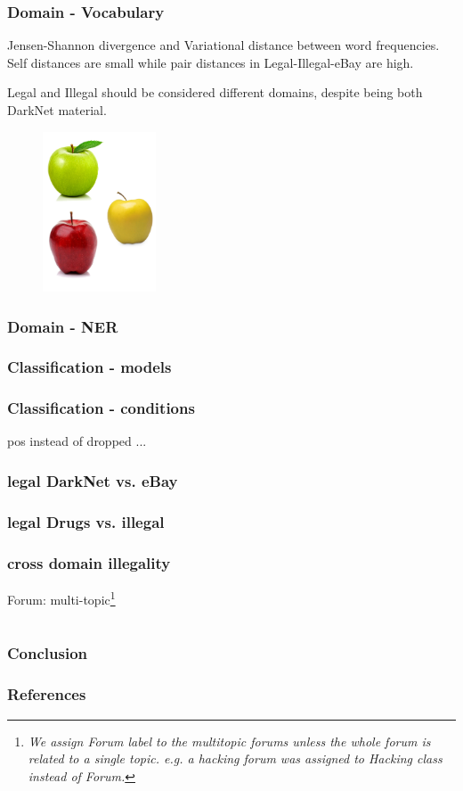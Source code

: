 \documentclass[t,xcolor={svgnames,table}]{beamer}
\begin{document}
\begin{frame}
	\frametitle{Domain - Vocabulary}
	Jensen-Shannon divergence and Variational distance between word frequencies.
	Self distances are small while pair distances in Legal-Illegal-eBay are high.
	
	Legal and Illegal should be considered different domains, despite being both DarkNet material.
	\begin{figure}
		\centering
		\includegraphics[width=0.3\textwidth]{3different.png}
	\end{figure}

\end{frame}

\begin{frame}
	\frametitle{Domain - NER}
\end{frame}

\begin{frame}
	\frametitle{Classification - models}
\end{frame}
\begin{frame}
	\frametitle{Classification - conditions}
	pos instead of
	dropped 
	...
\end{frame}

\begin{frame}
	\frametitle{legal DarkNet vs. eBay}
\end{frame}
\begin{frame}
	\frametitle{legal Drugs vs. illegal}
\end{frame}
\begin{frame}
	\frametitle{cross domain illegality}
	Forum: multi-topic\footnote{\textit{We assign Forum label to the multitopic forums unless the whole forum is related to
a single topic. e.g. a hacking forum was assigned
to Hacking class instead of Forum.}} \cite{AlNabki17}
\end{frame}
\section*{}

\begin{frame}
\frametitle{Conclusion}
\end{frame}

\begin{frame}[allowframebreaks]
\frametitle{References}

\tiny
\end{frame}
\end{document}
